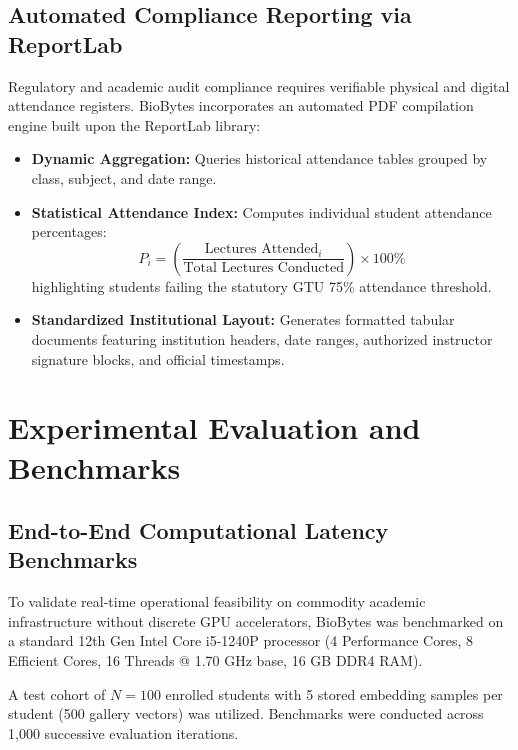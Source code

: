 \documentclass[12pt,a4paper,oneside]{report}
\begin{document}
\section{Automated Compliance Reporting via ReportLab}
Regulatory and academic audit compliance requires verifiable physical and digital attendance registers. BioBytes incorporates an automated PDF compilation engine built upon the ReportLab library:
\begin{itemize}
    \item \textbf{Dynamic Aggregation:} Queries historical attendance tables grouped by class, subject, and date range.
    \item \textbf{Statistical Attendance Index:} Computes individual student attendance percentages:
    \begin{equation}
    P_i = \left( \frac{\text{Lectures Attended}_i}{\text{Total Lectures Conducted}} \right) \times 100\%
    \end{equation}
    highlighting students failing the statutory GTU 75\% attendance threshold.
    \item \textbf{Standardized Institutional Layout:} Generates formatted tabular documents featuring institution headers, date ranges, authorized instructor signature blocks, and official timestamps.
\end{itemize}

\chapter{Experimental Evaluation and Benchmarks}

\section{End-to-End Computational Latency Benchmarks}
To validate real-time operational feasibility on commodity academic infrastructure without discrete GPU accelerators, BioBytes was benchmarked on a standard 12th Gen Intel Core i5-1240P processor (4 Performance Cores, 8 Efficient Cores, 16 Threads @ 1.70 GHz base, 16 GB DDR4 RAM). 

A test cohort of $N = 100$ enrolled students with 5 stored embedding samples per student (500 gallery vectors) was utilized. Benchmarks were conducted across 1,000 successive evaluation iterations.
\end{document}
